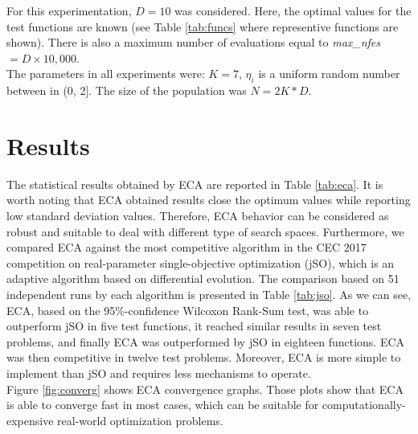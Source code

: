 \documentclass[graybox]{svmult}
\begin{document}
For this experimentation, $D = 10$ was considered. Here, the optimal values for the test 
functions are known (see Table \ref{tab:funcs} where representive functions are shown). There is also a maximum number of 
evaluations equal to \textit{max\_nfes} $= D \times 10,000$.\\

The parameters in all experiments were: $K = 7$, $\eta_i$ is a uniform random number 
between in (0, 2]. The size of the population was $N = 2K * D $.







\section{Results} %
\label{sec:results}

The statistical results obtained by ECA are reported in Table \ref{tab:eca}. 
It is worth noting  that ECA obtained results close the optimum values 
while reporting low standard deviation values. Therefore, ECA behavior can 
be considered as robust and suitable to deal with different type of search spaces. 
Furthermore, we compared ECA against the most competitive algorithm in 
the CEC 2017 competition on real-parameter single-objective optimization (jSO), 
which is an adaptive algorithm based on differential evolution. The comparison 
based on 51 independent runs by each algorithm is presented in Table \ref{tab:jso}. 
As we can see, ECA, based on the 95\%-confidence Wilcoxon Rank-Sum test, 
was able to outperform jSO in five test functions, it reached similar 
results in seven test problems, and finally ECA was outperformed by jSO 
in eighteen functions. ECA was then competitive in twelve test problems. 
Moreover, ECA is more simple to implement than jSO and requires less 
mechanisms to operate.\\

Figure \ref{fig:converg} shows ECA convergence graphs. Those plots show that 
ECA is able to converge fast in most cases, which can be suitable for 
computationally-expensive real-world optimization problems.  
\end{document}
